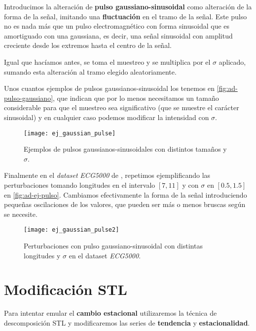Introducimos la alteración de \textbf{pulso gaussiano-sinusoidal} como alteración de la forma de la señal, imitando una \textbf{fluctuación} en el tramo de la señal. Este pulso no es nada más que un pulso electromagnético con forma sinusoidal que es amortiguado con una gaussiana, es decir, una señal sinusoidal con amplitud creciente desde los extremos hasta el centro de la señal.

Igual que hacíamos antes, se toma el muestreo y se multiplica por el $\sigma$ aplicado, sumando esta alteración al tramo elegido aleatoriamente.

Unos cuantos ejemplos de pulsos gaussianos-sinusoidal los tenemos en \autoref{fig:ad-pulso-gaussiano}, que indican que por lo menos necesitamos un tamaño considerable para que el muestreo sea significativo (que se muestre el carácter sinusoidal) y en cualquier caso podemos modificar la intensidad con $\sigma$.

\begin{figure}[htpb]
  \centering
  \texttt{[image: ej\_gaussian\_pulse]}
  \caption{Ejemplos de pulsos gaussianos-sinusoidales con distintos tamaños y $\sigma$.}
  \label{fig:ad-pulso-gaussiano}
\end{figure}

Finalmente en el \emph{dataset} \emph{ECG5000} de \cite{bagnall2020ts}, repetimos ejemplificando las perturbaciones tomando longitudes en el intervalo $[7, 11]$ y con $\sigma$ en $[0.5, 1.5]$ en \autoref{fig:ad-ej-pulso}. Cambiamos efectivamente la forma de la señal introduciendo pequeñas oscilaciones de los valores, que pueden ser más o menos bruscas según se necesite.

\begin{figure}[htpb]
  \centering
  \texttt{[image: ej\_gaussian\_pulse2]}
  \caption{Perturbaciones con pulso gaussiano-sinusoidal con distintas longitudes y $\sigma$ en el dataset \emph{ECG5000}.}
  \label{fig:ad-ej-pulso}
\end{figure}

\section{Modificación STL}

Para intentar emular el \textbf{cambio estacional} utilizaremos la técnica de descomposición STL y modificaremos las series de \textbf{tendencia} y \textbf{estacionalidad}.

